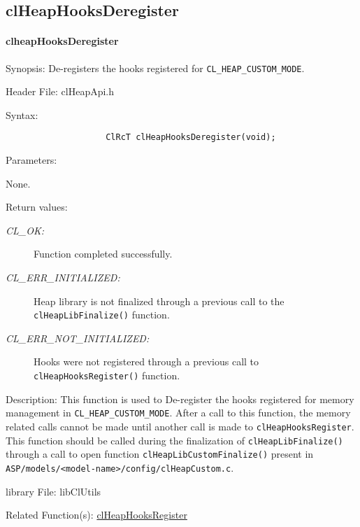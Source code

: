 \begin{flushleft}
\subsection{clHeapHooksDeregister}
\hypertarget{pageheap113}{}\paragraph{cl\-heap\-Hooks\-Deregister}\label{pageheap113}
\begin{Desc}
\item[Synopsis:]De-registers the hooks registered for {\tt{CL\_\-HEAP\_\-CUSTOM\_\-MODE}}. \end{Desc}
\begin{Desc}
\item[Header File:]clHeapApi.h\end{Desc}
\begin{Desc}
\item[Syntax:]
\footnotesize\begin{verbatim}
            		ClRcT clHeapHooksDeregister(void);
\end{verbatim}
\normalsize
\end{Desc}
\begin{Desc}
\item[Parameters:]
\begin{description}
None.
\end{description}
\end{Desc}
\begin{Desc}
\item[Return values:]
\begin{description}
\item[{\em CL\_\-OK:}] Function completed successfully.
\item[{\em CL\_\-ERR\_\-INITIALIZED:}] Heap library is not finalized through a previous call to the {\tt{clHeapLibFinalize()}} function.
\item[{\em CL\_\-ERR\_\-NOT\_\-INITIALIZED:}] Hooks were not registered through a previous call to {\tt{clHeapHooksRegister()}} function.
\end{description}
\end{Desc}
\begin{Desc}
\item[Description:] This function is used to De-register the hooks registered for memory management in {\tt{CL\_\-HEAP\_\-CUSTOM\_\-MODE}}. After a 
call to this function, the memory related calls cannot be made until
another call is made to {\tt{clHeapHooksRegister}}. This function
should be called during the finalization of {\tt{clHeapLibFinalize()}} through
a call to open function {\tt{clHeapLibCustomFinalize()}} present in
{\tt{ASP/models/<model-name>/config/clHeapCustom.c}}.
\end{Desc}
\begin{Desc}
\item[library File:]lib\-Cl\-Utils\end{Desc}
\begin{Desc}
\item[Related Function(s):]\hyperlink{pageheap112}{clHeapHooksRegister}\end{Desc}



\end{flushleft}
